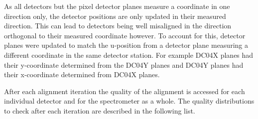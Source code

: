 As all detectors but the pixel detector planes measure a coordinate in one
direction only, the detector positions are only updated in their measured
direction.  This can lead to detectors being well misaligned in the direction
orthogonal to their measured coordinate however.  To account for this, detector
planes were updated to match the u-position from a detector plane measuring a
different coordinate in the same detector station.  For example DC04X planes had
their y-coordinate determined from the DC04Y planes and DC04Y planes had their
x-coordinate determined from DC04X planes.

After each alignment iteration the quality of the alignment is accessed for each
individual detector and for the spectrometer as a whole.  The quality
distributions to check after each iteration are described in the following list.

